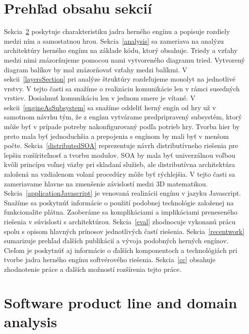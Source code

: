 \documentclass[11pt,slovak,a4paper,twoside]{article}
\begin{document}
\section{Preh\v{l}ad obsahu sekcií} \label{content}

Sekcia~\ref{insight} poskytuje charakteristiku jadra herného engínu a popisuje rozdiely medzi ním a samostatnou hrou.
Sekcia~\ref{analysis} sa zameriava na analýzu architektúry herného engínu na základe kódu, ktorý obsahuje. Triedy a vz\v{t}ahy medzi nimi znázor\v{n}ujeme pomocou nami vytvoreného diagramu tried. Vytvorený diagram balíkov by mal znázor\v{n}ova\v{t} vz\v{t}ahy medzi balíkmi.  
V sekcii~\ref{layersSection} pri analýze \v{s}truktúry rozde\v{l}ujeme monolyt na jednotlivé vrstvy. V tejto \v{c}asti sa sna\v{z}íme o realizáciu komunikácie len v rámci susedných vrstiev. Dosiahnu\v{t} komunikáciu len v jednom smere je vítané.
V sekcii~\ref{engineAsSubsystem} sa sna\v{z}íme oddeli\v{t} herný engín od hry u\v{z} v samotnom návrhu tým, \v{z}e z engínu vytvárame predpripravený subsystém, ktorý mô\v{z}e by\v{t} v prípade potreby nakonfigurovaný pod\v{l}a potrieb hry. Tvorba hier by preto mala by\v{t} jednoduch\v{s}ia a prepojenia s engínom by mali by\v{t} v men\v{s}om po\v{c}te. 
Sekcia~\ref{distributedSOA} reprezentuje návrh distributívneho rie\v{s}enia pre lep\v{s}iu roz\v{s}írite\v{l}nos\v{t} a tvorbu modulov. SOA by mala byť univerzálnou vo\v{l}bou kvôli princípu vo\v{l}nej väzby pri skladaní slu\v{z}ieb, ale distributívna architektúra zalo\v{z}ená na vzdialenom volaní procedúry mô\v{z}e by\v{t} rýchlej\v{s}ia. V tejto \v{c}asti sa zameriavame hlavne na zmen\v{s}enie závislostí medzi 3D matematikou.
Sekcia~\ref{applicationJavascript} je venovaná realizácii engínu v jazyku Javascript. Sna\v{z}íme sa poskytnú\v{t} informácie o pou\v{z}ití podobnej technológie zalo\v{z}enej na funkcionalite plátna. Zaoberáme sa komplikáciami a implikáciami preneseného rie\v{s}enia v súvislosti s architektúrou.
Sekcia~\ref{eval} zhodnocuje vykonanú prácu spolu s opisom hlavných prínosov jednotlivých \v{c}astí rie\v{s}enia.
Sekcia~\ref{recentwork} sumarizuje preh\v{l}ad \v{d}al\v{s}ích publikácií a vývoja podobných herných engínov. Cie\v{l}om je poskytnú\v{t} aj informácie o \v{d}al\v{s}ích komponentoch a technológiách pri tvorbe jadra herného engínu softvérového rie\v{s}enia.
Sekcia~\ref{cc} obsahuje zhodnotenie práce a \v{d}al\v{s}ích mo\v{z}ností roz\v{s}írenia tejto práce.


\section{Software product line and domain analysis} \label{insight}
\end{document}
